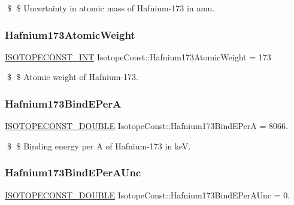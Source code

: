 \$ \$ Uncertainty in atomic mass of Hafnium-\/173 in amu. \mbox{\label{group___isotope_const-_hafnium-_hf173_gae6463555f7645cae4f037df31b6eff72}} 
\subsubsection{\texorpdfstring{Hafnium173\+Atomic\+Weight}{Hafnium173AtomicWeight}}
{\footnotesize\ttfamily \mbox{\hyperlink{group___isotope_const-_macros_ga5f18360b3e99483a35c32d789e62621c}{I\+S\+O\+T\+O\+P\+E\+C\+O\+N\+S\+T\+\_\+\+I\+NT}} Isotope\+Const\+::\+Hafnium173\+Atomic\+Weight = 173}

\$ \$ Atomic weight of Hafnium-\/173. \mbox{\label{group___isotope_const-_hafnium-_hf173_gac6a8ecc07cc112589e83fde85743225f}} 
\subsubsection{\texorpdfstring{Hafnium173\+Bind\+E\+PerA}{Hafnium173BindEPerA}}
{\footnotesize\ttfamily \mbox{\hyperlink{group___isotope_const-_macros_ga8f45a7272ce02c0b4c65c44636ed719a}{I\+S\+O\+T\+O\+P\+E\+C\+O\+N\+S\+T\+\_\+\+D\+O\+U\+B\+LE}} Isotope\+Const\+::\+Hafnium173\+Bind\+E\+PerA = 8066.}

\$ \$ Binding energy per A of Hafnium-\/173 in keV. \mbox{\label{group___isotope_const-_hafnium-_hf173_gae6293ad16ce64429a7ebcf4ee518df8e}} 
\subsubsection{\texorpdfstring{Hafnium173\+Bind\+E\+Per\+A\+Unc}{Hafnium173BindEPerAUnc}}
{\footnotesize\ttfamily \mbox{\hyperlink{group___isotope_const-_macros_ga8f45a7272ce02c0b4c65c44636ed719a}{I\+S\+O\+T\+O\+P\+E\+C\+O\+N\+S\+T\+\_\+\+D\+O\+U\+B\+LE}} Isotope\+Const\+::\+Hafnium173\+Bind\+E\+Per\+A\+Unc = 0.}


